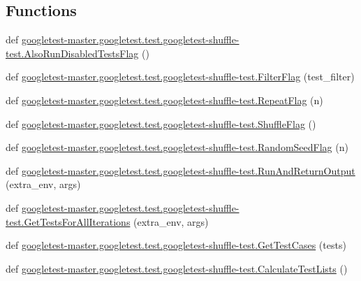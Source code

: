 \subsection*{Functions}
\begin{DoxyCompactItemize}
\item 
def \mbox{\hyperlink{namespacegoogletest-master_1_1googletest_1_1test_1_1googletest-shuffle-test_a49d84c9e10fa904bfdaf7b524d240fc4}{googletest-\/master.\+googletest.\+test.\+googletest-\/shuffle-\/test.\+Also\+Run\+Disabled\+Tests\+Flag}} ()
\item 
def \mbox{\hyperlink{namespacegoogletest-master_1_1googletest_1_1test_1_1googletest-shuffle-test_a5ec4842a8aadf5951535e2b0da4f8e7f}{googletest-\/master.\+googletest.\+test.\+googletest-\/shuffle-\/test.\+Filter\+Flag}} (test\+\_\+filter)
\item 
def \mbox{\hyperlink{namespacegoogletest-master_1_1googletest_1_1test_1_1googletest-shuffle-test_a0a250bbaf2ebb6582da1d077735a3966}{googletest-\/master.\+googletest.\+test.\+googletest-\/shuffle-\/test.\+Repeat\+Flag}} (n)
\item 
def \mbox{\hyperlink{namespacegoogletest-master_1_1googletest_1_1test_1_1googletest-shuffle-test_a69c745d55f668057397774ea1126404f}{googletest-\/master.\+googletest.\+test.\+googletest-\/shuffle-\/test.\+Shuffle\+Flag}} ()
\item 
def \mbox{\hyperlink{namespacegoogletest-master_1_1googletest_1_1test_1_1googletest-shuffle-test_a0c7133f025e23be1b95a9f0ae34563ec}{googletest-\/master.\+googletest.\+test.\+googletest-\/shuffle-\/test.\+Random\+Seed\+Flag}} (n)
\item 
def \mbox{\hyperlink{namespacegoogletest-master_1_1googletest_1_1test_1_1googletest-shuffle-test_a326f5fcf5098400942a26c5206935fa8}{googletest-\/master.\+googletest.\+test.\+googletest-\/shuffle-\/test.\+Run\+And\+Return\+Output}} (extra\+\_\+env, args)
\item 
def \mbox{\hyperlink{namespacegoogletest-master_1_1googletest_1_1test_1_1googletest-shuffle-test_a140dbf3b6aebd523a89a2f420190d940}{googletest-\/master.\+googletest.\+test.\+googletest-\/shuffle-\/test.\+Get\+Tests\+For\+All\+Iterations}} (extra\+\_\+env, args)
\item 
def \mbox{\hyperlink{namespacegoogletest-master_1_1googletest_1_1test_1_1googletest-shuffle-test_a175d0af05e1ad25db231bb5302cc8951}{googletest-\/master.\+googletest.\+test.\+googletest-\/shuffle-\/test.\+Get\+Test\+Cases}} (tests)
\item 
def \mbox{\hyperlink{namespacegoogletest-master_1_1googletest_1_1test_1_1googletest-shuffle-test_a381a9c63c0567dab9fce267c316a10f8}{googletest-\/master.\+googletest.\+test.\+googletest-\/shuffle-\/test.\+Calculate\+Test\+Lists}} ()
\end{DoxyCompactItemize}
